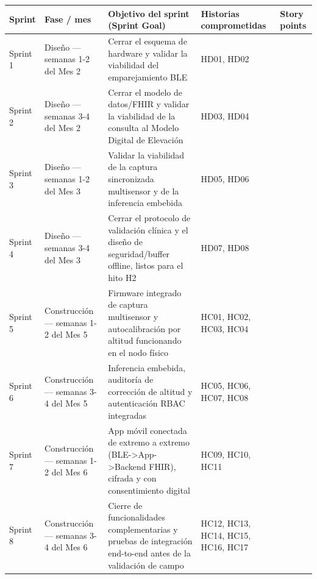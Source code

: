 \documentclass[11pt,a4paper]{article}
\begin{document}
{\small
\begin{longtable}[]{@{}
  >{\raggedright\arraybackslash}p{}
  >{\raggedright\arraybackslash}p{}
  >{\raggedright\arraybackslash}p{}
  >{\raggedright\arraybackslash}p{}
  >{\raggedright\arraybackslash}p{}@{}}
\toprule\noalign{}
\begin{minipage}[b]{\linewidth}\raggedright
Sprint
\end{minipage} & \begin{minipage}[b]{\linewidth}\raggedright
Fase / mes
\end{minipage} & \begin{minipage}[b]{\linewidth}\raggedright
Objetivo del sprint (Sprint Goal)
\end{minipage} & \begin{minipage}[b]{\linewidth}\raggedright
Historias comprometidas
\end{minipage} & \begin{minipage}[b]{\linewidth}\raggedright
Story points
\end{minipage} \\
\midrule\noalign{}
\endhead
\bottomrule\noalign{}
\endlastfoot
Sprint 1 & Diseño --- semanas 1-2 del Mes 2 & Cerrar el esquema de hardware y validar la viabilidad del emparejamiento BLE & HD01, HD02 & 8 \\
Sprint 2 & Diseño --- semanas 3-4 del Mes 2 & Cerrar el modelo de datos/FHIR y validar la viabilidad de la consulta al Modelo Digital de Elevación & HD03, HD04 & 10 \\
Sprint 3 & Diseño --- semanas 1-2 del Mes 3 & Validar la viabilidad de la captura sincronizada multisensor y de la inferencia embebida & HD05, HD06 & 16 \\
Sprint 4 & Diseño --- semanas 3-4 del Mes 3 & Cerrar el protocolo de validación clínica y el diseño de seguridad/buffer offline, listos para el hito H2 & HD07, HD08 & 13 \\
Sprint 5 & Construcción --- semanas 1-2 del Mes 5 & Firmware integrado de captura multisensor y autocalibración por altitud funcionando en el nodo físico & HC01, HC02, HC03, HC04 & 26 \\
Sprint 6 & Construcción --- semanas 3-4 del Mes 5 & Inferencia embebida, auditoría de corrección de altitud y autenticación RBAC integradas & HC05, HC06, HC07, HC08 & 26 \\
Sprint 7 & Construcción --- semanas 1-2 del Mes 6 & App móvil conectada de extremo a extremo (BLE-\textgreater App-\textgreater Backend FHIR), cifrada y con consentimiento digital & HC09, HC10, HC11 & 26 \\
Sprint 8 & Construcción --- semanas 3-4 del Mes 6 & Cierre de funcionalidades complementarias y pruebas de integración end-to-end antes de la validación de campo & HC12, HC13, HC14, HC15, HC16, HC17 & 39 \\
\end{longtable}
}
\end{document}
